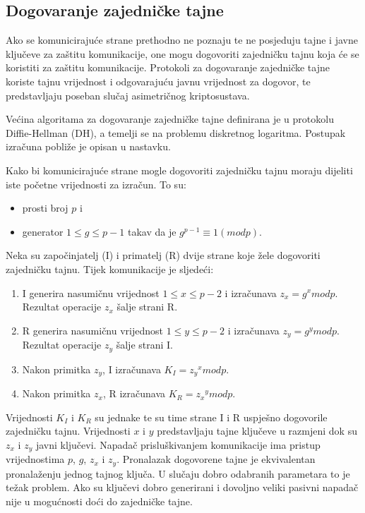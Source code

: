 \subsection{Dogovaranje zajedničke tajne}
\label{sec:dh}
Ako se komunicirajuće strane prethodno ne poznaju te ne posjeduju tajne i
javne ključeve za zaštitu komunikacije, one mogu dogovoriti zajedničku tajnu
koja će se koristiti za zaštitu komunikacije. Protokoli za dogovaranje
zajedničke tajne koriste tajnu vrijednost i odgovarajuću javnu vrijednost za
dogovor, te predstavljaju poseban slučaj asimetričnog kriptosustava.

Većina algoritama za dogovaranje zajedničke tajne definirana je u
protokolu Diffie-Hellman \cite{DH} (DH), a temelji se na problemu diskretnog
logaritma. Postupak izračuna pobliže je opisan u nastavku.


Kako bi komunicirajuće strane mogle dogovoriti zajedničku tajnu moraju dijeliti 
iste početne vrijednosti za izračun. To su:
\begin{itemize}
\item prosti broj $p$ i
\item generator $1 \leq g \leq p-1$ takav da je $g^{p-1} \equiv 1(mod p)$.
\end{itemize}

Neka su započinjatelj (I) i primatelj (R) dvije strane koje žele dogovoriti
zajedničku tajnu. Tijek komunikacije je sljedeći:
\begin{enumerate}
\item I generira nasumičnu vrijednost $1 \leq x \leq p-2$ i izračunava $z_x=g^x mod p$.
Rezultat operacije $z_x$ šalje strani R.
\item R generira nasumičnu vrijednost $1 \leq y \leq p-2$ i izračunava $z_y=g^y mod p$.
Rezultat operacije $z_y$ šalje strani I.
\item Nakon primitka $z_y$, I izračunava $K_I = {z_y}^x mod p$.
\item Nakon primitka $z_x$, R izračunava $K_R = {z_x}^y mod p$.
\end{enumerate}

Vrijednosti $K_I$ i $K_R$ su jednake te su time strane I i R
uspješno dogovorile zajedničku tajnu. Vrijednosti $x$ i $y$ predstavljaju tajne
ključeve u razmjeni dok su $z_x$ i $z_y$ javni ključevi. Napadač prisluškivanjem
komunikacije ima pristup vrijednostima $p$, $g$, $z_x$ i $z_y$. Pronalazak
dogovorene tajne je ekvivalentan pronalaženju jednog tajnog ključa. U slučaju
dobro odabranih parametara to je težak problem. Ako su ključevi
dobro generirani i dovoljno veliki pasivni napadač nije u mogućnosti doći do
zajedničke tajne. \cite[str. 341]{van2011encyclopedia}

